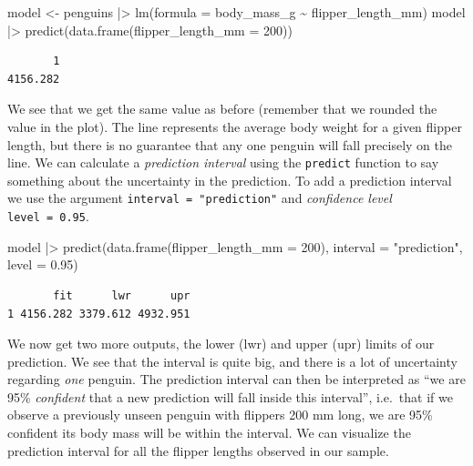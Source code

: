 \documentclass[
  letterpaper,
  DIV=11,
  numbers=noendperiod]{scrreprt}
\newenvironment{Shaded}{\begin{snugshade}}{\end{snugshade}}
\newcommand{\AttributeTok}[1]{\textcolor[rgb]{0.40,0.45,0.13}{#1}}
\newcommand{\DecValTok}[1]{\textcolor[rgb]{0.68,0.00,0.00}{#1}}
\newcommand{\FloatTok}[1]{\textcolor[rgb]{0.68,0.00,0.00}{#1}}
\newcommand{\FunctionTok}[1]{\textcolor[rgb]{0.28,0.35,0.67}{#1}}
\newcommand{\NormalTok}[1]{\textcolor[rgb]{0.00,0.23,0.31}{#1}}
\newcommand{\OtherTok}[1]{\textcolor[rgb]{0.00,0.23,0.31}{#1}}
\newcommand{\SpecialCharTok}[1]{\textcolor[rgb]{0.37,0.37,0.37}{#1}}
\newcommand{\StringTok}[1]{\textcolor[rgb]{0.13,0.47,0.30}{#1}}
\begin{document}
\begin{Shaded}
\begin{Highlighting}[]
\NormalTok{model }\OtherTok{\textless{}{-}}\NormalTok{ penguins }\SpecialCharTok{|\textgreater{}} 
  \FunctionTok{lm}\NormalTok{(}\AttributeTok{formula =}\NormalTok{ body\_mass\_g }\SpecialCharTok{\textasciitilde{}}\NormalTok{ flipper\_length\_mm)}
\NormalTok{model }\SpecialCharTok{|\textgreater{}} \FunctionTok{predict}\NormalTok{(}\FunctionTok{data.frame}\NormalTok{(}\AttributeTok{flipper\_length\_mm =} \DecValTok{200}\NormalTok{))}
\end{Highlighting}
\end{Shaded}

\begin{verbatim}
       1 
4156.282 
\end{verbatim}

We see that we get the same value as before (remember that we rounded
the value in the plot). The line represents the average body weight for
a given flipper length, but there is no guarantee that any one penguin
will fall precisely on the line. We can calculate a \emph{prediction
interval} using the \texttt{predict} function to say something about the
uncertainty in the prediction. To add a prediction interval we use the
argument \texttt{interval\ =\ "prediction"} and \emph{confidence level}
\texttt{level\ =\ 0.95}.

\begin{Shaded}
\begin{Highlighting}[]
\NormalTok{model }\SpecialCharTok{|\textgreater{}} \FunctionTok{predict}\NormalTok{(}\FunctionTok{data.frame}\NormalTok{(}\AttributeTok{flipper\_length\_mm =} \DecValTok{200}\NormalTok{), }\AttributeTok{interval =} \StringTok{"prediction"}\NormalTok{, }\AttributeTok{level =} \FloatTok{0.95}\NormalTok{)}
\end{Highlighting}
\end{Shaded}

\begin{verbatim}
       fit      lwr      upr
1 4156.282 3379.612 4932.951
\end{verbatim}

We now get two more outputs, the lower (lwr) and upper (upr) limits of
our prediction. We see that the interval is quite big, and there is a
lot of uncertainty regarding \emph{one} penguin. The prediction interval
can then be interpreted as ``we are 95\% \emph{confident} that a new
prediction will fall inside this interval'', i.e.~that if we observe a
previously unseen penguin with flippers 200 mm long, we are 95\%
confident its body mass will be within the interval. We can visualize
the prediction interval for all the flipper lengths observed in our
sample.
\end{document}
